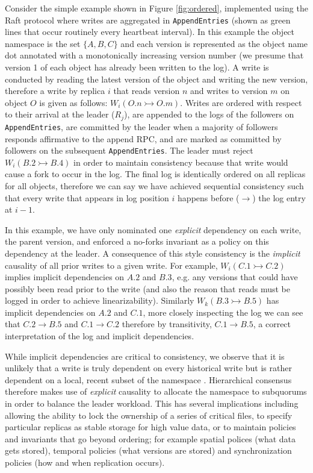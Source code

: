 \documentclass{article}
\begin{document}
Consider the simple example shown in Figure \ref{fig:ordered}, implemented using the Raft protocol where writes are aggregated in \texttt{AppendEntries} (shown as green lines that occur routinely every heartbeat interval). In this example the object namespace is the set $\{A, B, C\}$ and each version is represented as the object name dot annotated with a monotonically increasing version number (we presume that version 1 of each object has already been written to the log). A write is conducted by reading the latest version of the object and writing the new version, therefore a write by replica $i$ that reads version $n$ and writes to version $m$ on object $O$ is given as follows: $W_i(O.n \rightarrowtail O.m)$.   Writes are ordered with respect to their arrival at the leader ($R_j$), are appended to the logs of the followers on \texttt{AppendEntries}, are committed by the leader when a majority of followers responds affirmative to the append RPC, and are marked as committed by followers on the subsequent \texttt{AppendEntries}. The leader must reject $W_i(B.2 \rightarrowtail B.4)$ in order to maintain consistency because that write would cause a fork to occur in the log. The final log is identically ordered on all replicas for all objects, therefore we can say we have achieved sequential consistency such that every write that appears in log position $i$ happens before ($\rightarrow$) the log entry at $i-1$.

In this example, we have only nominated one \textit{explicit} dependency on each write, the parent version, and enforced a no-forks invariant as a policy on this dependency at the leader. A consequence of this style consistency is the \textit{implicit} causality of all prior writes to a given write. For example, $W_i(C.1 \rightarrowtail C.2)$ implies implicit dependencies on $A.2$ and $B.3$, e.g. any versions that could have possibly been read prior to the write (and also the reason that reads must be logged in order to achieve linearizability). Similarly $W_k(B.3 \rightarrowtail B.5)$ has implicit dependencies on $A.2$ and $C.1$, more closely inspecting the log we can see that $C.2 \rightarrow B.5$ and $C.1 \rightarrow C.2$ therefore by transitivity, $C.1 \rightarrow B.5$, a correct interpretation of the log and implicit dependencies.

While implicit dependencies are critical to consistency, we observe that it is unlikely that a write is truly dependent on every historical write but is rather dependent on a local, recent subset of the namespace \cite{bailis_potential_2012}. Hierarchical consensus therefore makes use of \textit{explicit} causality to allocate the namespace to subquorums in order to balance the leader workload. This has several implications including allowing the ability to lock the ownership of a series of critical files, to specify particular replicas as stable storage for high value data, or to maintain policies and invariants that go beyond ordering; for example spatial polices (what data gets stored), temporal policies (what versions are stored) and synchronization policies (how and when replication occurs).
\end{document}
